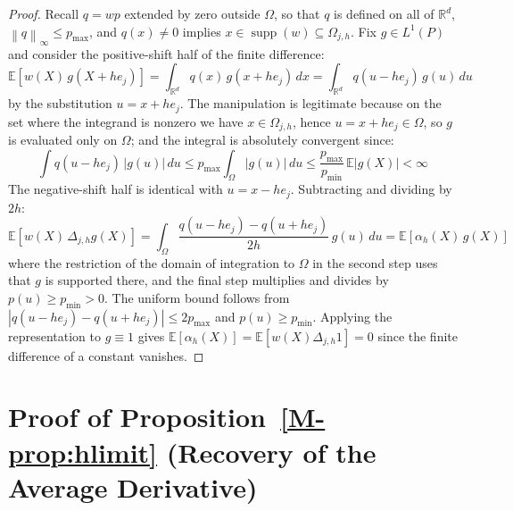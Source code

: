 \documentclass[12pt,a4paper]{article}
\numberwithin{equation}{section}
\theoremstyle{plain}
\theoremstyle{definition}
\newcommand{\norm}[1]{\left\| #1 \right\|}
\newcommand{\R}{\mathbb{R}}
\newcommand{\E}{\mathbb{E}}
\newcommand{\abs}[1]{\left| #1 \right|}
\newcommand{\Dh}{\Delta_{j,h}}
\begin{document}
	\begin{proof}
		Recall $q = wp$ extended by zero outside $\Omega$, so that $q$ is defined on
		all of $\R^d$, $\norm{q}_\infty \leq p_{\max}$, and $q(x) \neq 0$ implies
		$x \in \operatorname{supp}(w) \subseteq \Omega_{j,h}$. Fix $g \in L^1(P)$ and
		consider the positive-shift half of the finite difference:
		\begin{equation}
			\E\left[w(X)\, g(X + h e_j)\right]
			= \int_{\R^d} q(x)\, g(x + h e_j)\, dx
			= \int_{\R^d} q(u - h e_j)\, g(u)\, du
		\end{equation}
		by the substitution $u = x + h e_j$. The manipulation is legitimate because
		on the set where the integrand is nonzero we have $x \in \Omega_{j,h}$, hence
		$u = x + h e_j \in \Omega$, so $g$ is evaluated only on $\Omega$; and the
		integral is absolutely convergent since:
		\begin{equation}
			\int q(u - h e_j)\, \abs{g(u)}\, du
			\leq p_{\max} \int_\Omega \abs{g(u)}\, du
			\leq \frac{p_{\max}}{p_{\min}} \, \E\abs{g(X)} < \infty
		\end{equation}
		The negative-shift half is identical with $u = x - h e_j$. Subtracting and
		dividing by $2h$:
		\begin{equation}
			\E\left[w(X)\, \Dh g(X)\right]
			= \int_\Omega \frac{q(u - h e_j) - q(u + h e_j)}{2h}\, g(u)\, du
			= \E\left[\alpha_h(X)\, g(X)\right]
		\end{equation}
		where the restriction of the domain of integration to $\Omega$ in the second
		step uses that $g$ is supported there, and the final step multiplies and
		divides by $p(u) \geq p_{\min} > 0$. The uniform bound follows from
		$\abs{q(u - h e_j) - q(u + h e_j)} \leq 2 p_{\max}$ and $p(u) \geq p_{\min}$.
		Applying the representation to $g \equiv 1$ gives
		$\E[\alpha_h(X)] = \E[w(X) \Dh 1] = 0$ since the finite difference of a
		constant vanishes.
	\end{proof}
	
	\section{Proof of Proposition~\ref{M-prop:hlimit} (Recovery of the Average
		Derivative)}
	\label{app:prop_hlimit}
	
\end{document}
